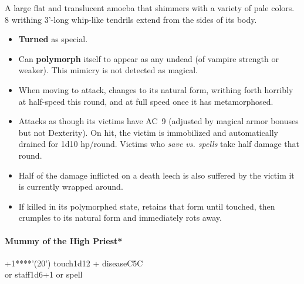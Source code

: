 \documentclass[english,11pt,openany,letterpaper,twocolumn]{book}
\begin{document}
A large flat and translucent amoeba that shimmers with a variety of pale colors. 8 writhing 3'-long whip-like tendrils extend from the sides of its body.
\begin{itemize}[leftmargin=*,label=\itshape\textbullet]
	\item
	\textbf{Turned} as special.
	\item
	Can \textbf{polymorph} itself to appear as any undead (of vampire strength or weaker). This mimicry is not detected as magical.
	\item
	When moving to attack, changes to its natural form, writhing forth horribly at half-speed this round, and at full speed once it has metamorphosed.
	\item
	Attacks as though its victims have AC~9 (adjusted by magical armor bonuses but not Dexterity). On hit, the victim is immobilized and automatically drained for 1d10 hp/round. Victims who \emph{save vs. spells} take half damage that round.
	\item
	Half of the damage inflicted on a death leech is also suffered by the victim it is currently wrapped around.
	\item
	If killed in its polymorphed state, retains that form until touched, then crumples to its natural form and immediately rots away.
\end{itemize}


\skipline
\hypertarget{mummy}{}
\paragraph{Mummy of the High Priest*}

%

+1****'(20') touch\tab 1d12 + disease\tab C5\tab C
\\or staff\tab 1d6+1 or spell
\end{document}

